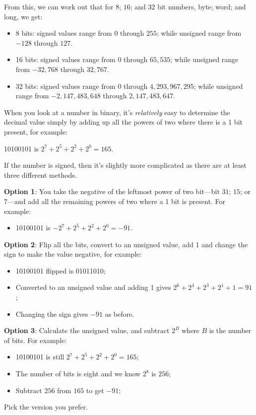From this, we can work out that for $8$; $16$; and $32$ bit numbers,
byte; word; and long, we get:
\begin{itemize}
\item 8 bits: signed values range from $0$ through $255$;  while unsigned range from $-128$ through $127$.

\item 16 bits: signed values range from $0$ through $65,535$;  while unsigned range from $-32,768$ through $32,767$.

\item 32 bits: signed values range from $0$ through $4,293,967,295$; while unsigned range from $-2,147,483,648$ through $2,147,483,647$.
\end{itemize}

When you look at a number in binary, it's \emph{relatively} easy to determine the decimal
value simply by adding up all the powers of two where there is a 1
bit present, for example:

10100101 is $2^{7}+2^{5}+2^{2}+2^{0}=165$.

If the number is signed, then it's slightly more complicated as there
are at least three different methods. 

\textbf{Option 1}: You take the negative of the leftmost power of two bit---bit $31$; $15$; or $7$---and add
all the remaining powers of two where a 1 bit is present. For example:
\begin{itemize}
\item 10100101 is $-2^{7}+2^{5}+2^{2}+2^{0}=-91$.
\end{itemize}
\textbf{Option 2}: Flip all the bits, convert to an unsigned value,
add 1 and change the sign to make the value negative, for example:
\begin{itemize}
\item 10100101 flipped is 01011010;
\item Converted to an unsigned value and adding 1 gives $2^{6}+2^{4}+2^{3}+2^{1}+1=91$;
\item Changing the sign gives $-91$ as before.
\end{itemize}
\textbf{Option 3}: Calculate the unsigned value, and subtract $2^{B}$ where $B$ is the number of bits. For example:
\begin{itemize}
\item 10100101 is still $2^{7}+2^{5}+2^{2}+2^{0}=165$;
\item The number of bits is eight and we know $2^{8}$ is $256$;
\item Subtract $256$ from $165$ to get $-91$;
\end{itemize}
Pick the version you prefer.

